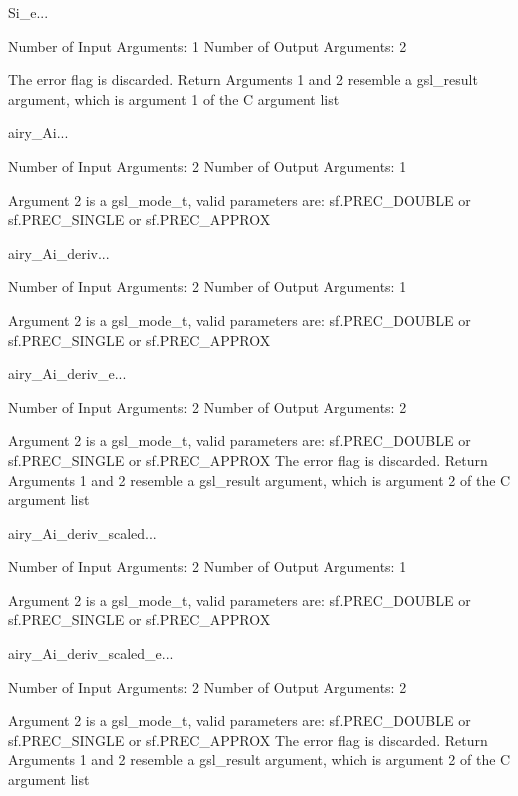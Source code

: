 \begin{funcdesc}{Si_e}{...}

    Number of Input  Arguments:  1
    Number of Output Arguments:  2

The error flag is discarded.
Return Arguments 1 and 2 resemble a gsl_result argument,
	which is  argument 1 of the C argument list

\end{funcdesc}

\begin{funcdesc}{airy_Ai}{...}

    Number of Input  Arguments:  2
    Number of Output Arguments:  1

 Argument 2 is a gsl_mode_t, valid parameters are:
	sf.PREC_DOUBLE or sf.PREC_SINGLE or sf.PREC_APPROX

\end{funcdesc}

\begin{funcdesc}{airy_Ai_deriv}{...}

    Number of Input  Arguments:  2
    Number of Output Arguments:  1

 Argument 2 is a gsl_mode_t, valid parameters are:
	sf.PREC_DOUBLE or sf.PREC_SINGLE or sf.PREC_APPROX

\end{funcdesc}

\begin{funcdesc}{airy_Ai_deriv_e}{...}

    Number of Input  Arguments:  2
    Number of Output Arguments:  2

 Argument 2 is a gsl_mode_t, valid parameters are:
	sf.PREC_DOUBLE or sf.PREC_SINGLE or sf.PREC_APPROX
The error flag is discarded.
Return Arguments 1 and 2 resemble a gsl_result argument,
	which is  argument 2 of the C argument list

\end{funcdesc}

\begin{funcdesc}{airy_Ai_deriv_scaled}{...}

    Number of Input  Arguments:  2
    Number of Output Arguments:  1

 Argument 2 is a gsl_mode_t, valid parameters are:
	sf.PREC_DOUBLE or sf.PREC_SINGLE or sf.PREC_APPROX

\end{funcdesc}

\begin{funcdesc}{airy_Ai_deriv_scaled_e}{...}

    Number of Input  Arguments:  2
    Number of Output Arguments:  2

 Argument 2 is a gsl_mode_t, valid parameters are:
	sf.PREC_DOUBLE or sf.PREC_SINGLE or sf.PREC_APPROX
The error flag is discarded.
Return Arguments 1 and 2 resemble a gsl_result argument,
	which is  argument 2 of the C argument list

\end{funcdesc}

